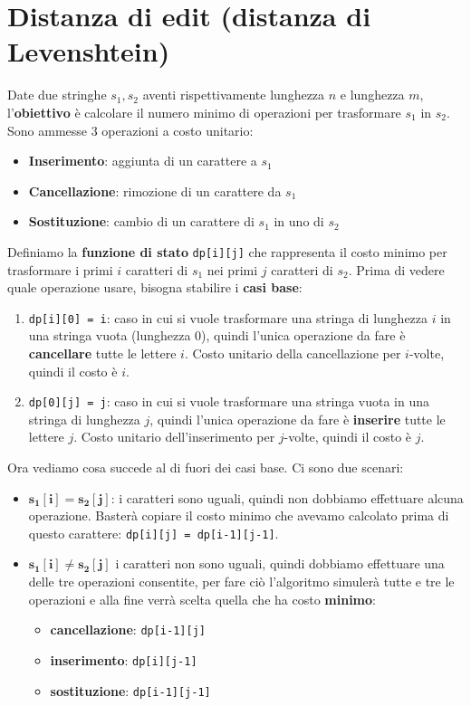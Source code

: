 \section{Distanza di edit (distanza di Levenshtein)}
Date due stringhe $s_1, s_2$ aventi rispettivamente lunghezza $n$ e lunghezza $m$,
l'\textbf{obiettivo} è calcolare il numero minimo di operazioni per trasformare $s_1$
in $s_2$. Sono ammesse 3 operazioni a costo unitario:
\begin{itemize}
    \item \textbf{Inserimento}: aggiunta di un carattere a $s_1$
    \item \textbf{Cancellazione}: rimozione di un carattere da $s_1$
    \item \textbf{Sostituzione}: cambio di un carattere di $s_1$ in uno di $s_2$
\end{itemize}
Definiamo la \textbf{funzione di stato} \texttt{dp[i][j]} che rappresenta il costo 
minimo per trasformare i primi $i$ caratteri di $s_1$ nei primi $j$ caratteri di $s_2$.
Prima di vedere quale operazione usare, bisogna stabilire i \textbf{casi base}:
\begin{enumerate}
    \item \texttt{dp[i][0] = i}: caso in cui si vuole trasformare una stringa di lunghezza
    $i$ in una stringa vuota (lunghezza 0), quindi l'unica operazione da fare è \textbf{cancellare} tutte le lettere $i$.
    Costo unitario della cancellazione per $i$-volte, quindi il costo è $i$.
    \item \texttt{dp[0][j] = j}: caso in cui si vuole trasformare una stringa vuota in una
    stringa di lunghezza $j$, quindi l'unica operazione da fare è \textbf{inserire} tutte le lettere $j$.
    Costo unitario dell'inserimento per $j$-volte, quindi il costo è $j$.
\end{enumerate}
Ora vediamo cosa succede al di fuori dei casi base. Ci sono due scenari:
\begin{itemize}
    \item $\bm{s_1[i] = s_2[j]}$: i caratteri sono uguali, quindi non dobbiamo
    effettuare alcuna operazione. Basterà copiare il costo minimo che avevamo calcolato
    prima di questo carattere: \texttt{dp[i][j] = dp[i-1][j-1]}.
    \item $\bm{s_1[i] \ne s_2[j]}$ i caratteri non sono uguali, quindi dobbiamo effettuare
    una delle tre operazioni consentite, per fare ciò l'algoritmo simulerà tutte e tre le operazioni
    e alla fine verrà scelta quella che ha costo \textbf{minimo}:
    \begin{itemize}
        \item \textbf{cancellazione}: \texttt{dp[i-1][j]}
        \item \textbf{inserimento}: \texttt{dp[i][j-1]}
        \item \textbf{sostituzione}: \texttt{dp[i-1][j-1]}
    \end{itemize}  
\end{itemize}

